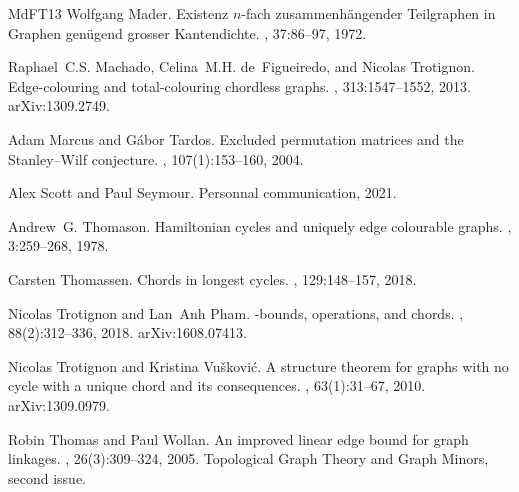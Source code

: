 \documentclass[11pt]{article}
\begin{document}
\begin{thebibliography}{MdFT13}
Wolfgang Mader.
\newblock Existenz {$n$}-fach zusammenh\"angender {T}eilgraphen in {G}raphen
  gen\"ugend grosser {K}antendichte.
, 37:86--97, 1972.

Raphael~C.S. Machado, Celina~M.H. de~Figueiredo, and Nicolas Trotignon.
\newblock Edge-colouring and total-colouring chordless graphs.
, 313:1547--1552, 2013.
\newblock arXiv:1309.2749.

Adam Marcus and Gábor Tardos.
\newblock Excluded permutation matrices and the {S}tanley–{W}ilf conjecture.
, 107(1):153--160,
  2004.

Alex Scott and Paul Seymour.
\newblock Personnal communication, 2021.

Andrew~G. Thomason.
\newblock Hamiltonian cycles and uniquely edge colourable graphs.
, 3:259--268, 1978.

Carsten Thomassen.
\newblock Chords in longest cycles.
, 129:148--157,
  2018.

Nicolas Trotignon and Lan~Anh Pham.
\newblock {\(\chi\)}-bounds, operations, and chords.
, 88(2):312--336, 2018.
\newblock arXiv:1608.07413.

Nicolas Trotignon and Kristina Vu{\v s}kovi{\'c}.
\newblock A structure theorem for graphs with no cycle with a unique chord and
  its consequences.
, 63(1):31--67, 2010.
\newblock arXiv:1309.0979.

Robin Thomas and Paul Wollan.
\newblock An improved linear edge bound for graph linkages.
, 26(3):309--324, 2005.
\newblock Topological Graph Theory and Graph Minors, second issue.

\end{thebibliography}
\end{document}
